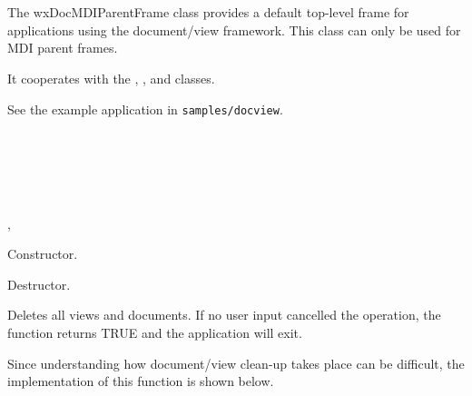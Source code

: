 \section{}\label{wxdocmdiparentframe}

The wxDocMDIParentFrame class provides a default top-level frame for
applications using the document/view framework. This class can only be used for MDI parent frames.

It cooperates with the , ,
\rtfsp{} and  classes.

See the example application in {\tt samples/docview}.


\\
\\
\\
\\


, 




Constructor.



Destructor.



Deletes all views and documents. If no user input cancelled the
operation, the function returns TRUE and the application will exit.

Since understanding how document/view clean-up takes place can be difficult,
the implementation of this function is shown below.

